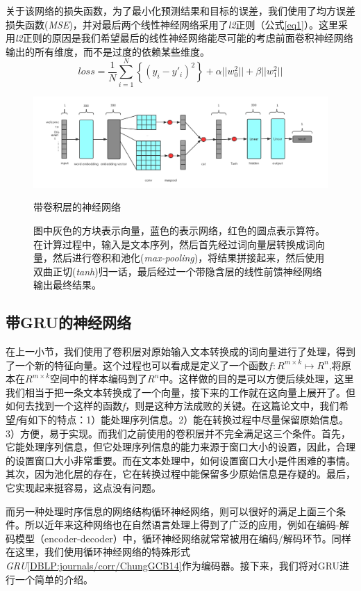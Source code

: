\documentclass[12pt]{template}
\begin{document}
关于该网络的损失函数，为了最小化预测结果和目标的误差，我们使用了均方误差损失函数(\textit{MSE})，并对最后两个线性神经网络采用了\textit{l2}正则（公式\ref{eq1}）。这里采用\textit{l2}正则的原因是我们希望最后的线性神经网络能尽可能的考虑前面卷积神经网络输出的所有维度，而不是过度的依赖某些维度。
\begin{equation}\label{eq1}
loss=\frac{1}{N}\displaystyle\sum_{i=1}^{N}\left\{(y_i-y'_i)^2\right\}+\alpha||w_0^2||+\beta||w_1^2||
\end{equation}
\begin{figure}[htbp]
    \centering
    \includegraphics[width=16cm]{conv_ranker.png}
    \caption{带卷积层的神经网络}
    \captionsetup{font=small,margin=30pt}\caption*{图中灰色的方块表示向量，蓝色的表示网络，红色的圆点表示算符。在计算过程中，输入是文本序列，然后首先经过词向量层转换成词向量，然后进行卷积和池化(\textit{max-pooling})，将结果拼接起来，然后使用双曲正切(\textit{tanh})归一话，最后经过一个带隐含层的线性前馈神经网络输出最终结果。}
    \label{f21}
\end{figure} 

\subsection{带GRU的神经网络}
在上一小节，我们使用了卷积层对原始输入文本转换成的词向量进行了处理，得到了一个新的特征向量。这个过程也可以看成是定义了一个函数\(f:R^{m\times k}\mapsto R^n\),将原本在\(R^{m\times k}\)空间中的样本编码到了\(R^n\)中。这样做的目的是可以方便后续处理，这里我们相当于把一条文本转换成了一个向量，接下来的工作就在这向量上展开了。但如何去找到一个这样的函数\textit{f}，则是这种方法成败的关键。在这篇论文中，我们希望\textit{f}有如下的特点：1）能处理序列信息。2）能在转换过程中尽量保留原始信息。3）方便，易于实现。而我们之前使用的卷积层并不完全满足这三个条件。首先，它能处理序列信息，但它处理序列信息的能力来源于窗口大小的设置，因此，合理的设置窗口大小非常重要。而在文本处理中，如何设置窗口大小是件困难的事情。其次，因为池化层的存在，它在转换过程中能保留多少原始信息是存疑的。最后，它实现起来挺容易，这点没有问题。

而另一种处理时序信息的网络结构循环神经网络，则可以很好的满足上面三个条件。所以近年来这种网络也在自然语言处理上得到了广泛的应用，例如在编码-解码模型（encoder-decoder）中，循环神经网络就常常被用在编码/解码环节。同样在这里，我们使用循环神经网络的特殊形式\textit{GRU}\ref{DBLP:journals/corr/ChungGCB14}作为编码器。接下来，我们将对GRU进行一个简单的介绍。
\end{document}
